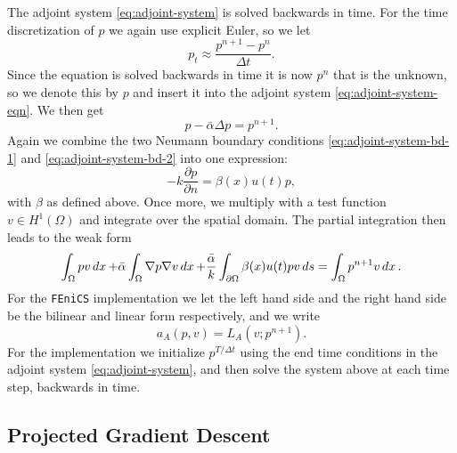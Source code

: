The adjoint system \eqref{eq:adjoint-system} is solved backwards in time. For the time discretization of $p$ we again use explicit Euler, so we let 
\begin{equation*}
 p_t \approx \frac{p^{n+1} - p^n}{\Delta t}.
\end{equation*}
Since the equation is solved backwards in time it is now $p^n$ that is the unknown, so we denote this by $p$ and insert it into the adjoint system \eqref{eq:adjoint-system-eqn}. We then get
\begin{equation*}
    p - \bar{\alpha}\Delta p =  p^{n+1}.
\end{equation*}
Again we combine the two Neumann boundary conditions \eqref{eq:adjoint-system-bd-1} and \eqref{eq:adjoint-system-bd-2} into one expression:
\begin{equation*}
    -k\frac{\partial p}{\partial n} = \beta(x)u(t)p,
\end{equation*}
with $\beta$ as defined above. Once more, we multiply with a test function $v\in H^1(\Omega)$ and integrate over the spatial domain. The partial integration then leads to the weak form
\begin{equation*}
    \int_\Omega pv\mathop{dx} + \bar{\alpha} \int_\Omega \nabla p \nabla v \mathop{dx} + \frac{\bar{\alpha}}{k}\int_{\partial\Omega} \beta(x)u(t)pv \mathop{ds}  = \int_\Omega p^{n+1}v\mathop{dx}.
\end{equation*}
For the \verb|FEniCS| implementation we let the left hand side and the right hand side be the bilinear and linear form respectively, and we write
\begin{equation*}
    a_A(p, v) = L_A(v; p^{n+1}).
\end{equation*}
For the implementation we initialize $p^{T/\Delta t}$ using the end time conditions in the adjoint system \eqref{eq:adjoint-system}, and then solve the system above at each time step, backwards in time.


\subsection{Projected Gradient Descent}\label{proj_grad}

